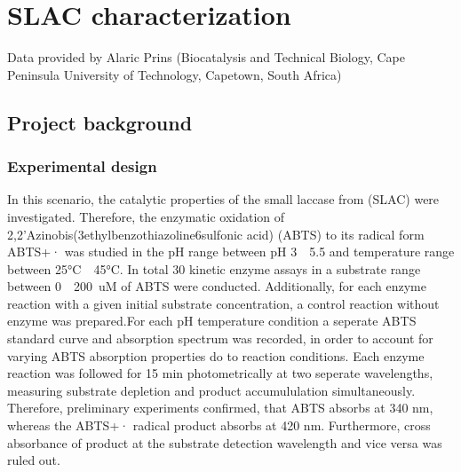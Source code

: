 \documentclass[letterpaper,10pt,english]{jupyterBook}
\begin{document}
\section{SLAC characterization}
\label{\detokenize{scenarios/SLAC_kinetic_characterization:scenario-c-br-slac-characterization}}\label{\detokenize{scenarios/SLAC_kinetic_characterization::doc}}
\sphinxAtStartPar
Data provided by Alaric Prins (Biocatalysis and Technical Biology, Cape Peninsula University of Technology, Capetown, South Africa)


\subsection{Project background}
\label{\detokenize{scenarios/SLAC_kinetic_characterization:project-background}}

\subsubsection{Experimental design}
\label{\detokenize{scenarios/SLAC_kinetic_characterization:experimental-design}}
\sphinxAtStartPar
In this scenario, the catalytic properties of the small laccase from  (SLAC) were investigated. Therefore, the enzymatic oxidation of 2,2’\sphinxhyphen{}Azino\sphinxhyphen{}bis(3\sphinxhyphen{}ethylbenzothiazoline\sphinxhyphen{}6\sphinxhyphen{}sulfonic acid) (ABTS) to its radical form ABTS+· was studied in the pH range between pH 3 \sphinxhyphen{} 5.5 and temperature range between 25°C \sphinxhyphen{} 45°C. In total 30 kinetic enzyme assays in a substrate range between 0 \sphinxhyphen{} 200 uM of ABTS were conducted. Additionally, for each enzyme reaction with a given initial substrate concentration, a control reaction without enzyme was prepared.For each pH \sphinxhyphen{} temperature condition a seperate ABTS standard curve and absorption spectrum was recorded, in order to account for varying ABTS absorption properties do to reaction conditions. Each enzyme reaction was followed for 15 min photometrically at two seperate wavelengths, measuring substrate depletion and product accumululation simultaneously. Therefore, preliminary experiments confirmed, that ABTS absorbs at 340 nm, whereas the ABTS+· radical product absorbs at 420 nm. Furthermore, cross absorbance of product at the substrate detection wavelength and vice versa was ruled out.
\end{document}
